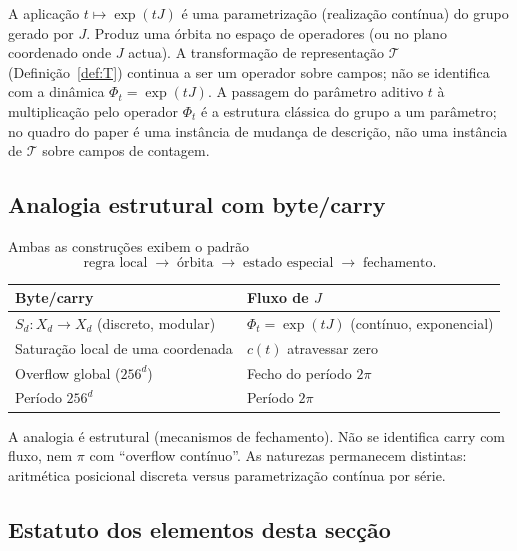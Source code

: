 \documentclass[11pt,a4paper]{article}
\begin{document}
A aplicação \(t\mapsto\exp(tJ)\) é uma parametrização (realização contínua) do grupo gerado por \(J\). Produz uma órbita no espaço de operadores (ou no plano coordenado onde \(J\) actua). A transformação de representação \(\mathcal T\) (Definição~\ref{def:T}) continua a ser um operador sobre campos; não se identifica com a dinâmica \(\Phi_t=\exp(tJ)\). A passagem do parâmetro aditivo \(t\) à multiplicação pelo operador \(\Phi_t\) é a estrutura clássica do grupo a um parâmetro; no quadro do paper é uma instância de mudança de descrição, não uma instância de \(\mathcal T\) sobre campos de contagem.

\subsection{Analogia estrutural com byte/carry}

Ambas as construções exibem o padrão
\[
\text{regra local}\;\longrightarrow\;\text{órbita}\;\longrightarrow\;\text{estado especial}\;\longrightarrow\;\text{fechamento}.
\]
\begin{center}
\small
\begin{tabular}{@{}ll@{}}
\toprule
Byte/carry & Fluxo de \(J\) \\
\midrule
\(S_d:X_d\to X_d\) (discreto, modular) & \(\Phi_t=\exp(tJ)\) (contínuo, exponencial) \\
Saturação local de uma coordenada & \(c(t)\) atravessar zero \\
Overflow global (\(256^d\)) & Fecho do período \(2\pi\) \\
Período \(256^d\) & Período \(2\pi\) \\
\bottomrule
\end{tabular}
\end{center}
A analogia é estrutural (mecanismos de fechamento). Não se identifica carry com fluxo, nem \(\pi\) com ``overflow contínuo''. As naturezas permanecem distintas: aritmética posicional discreta versus parametrização contínua por série.

\subsection{Estatuto dos elementos desta secção}
\end{document}
